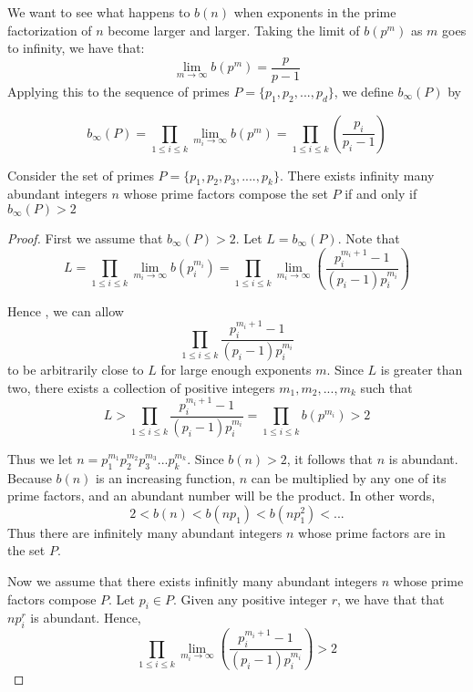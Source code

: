 \documentclass[../paper.tex]{article}
\begin{document}
We want to see what happens to $b(n)$ when exponents in the prime
factorization of $n$ become larger and larger. Taking the limit of
$b(p^m)$ as $m$ goes to infinity, we have that:
$$\lim_{m \rightarrow \infty}b(p^m) = \frac{p}{p-1}$$
Applying this to the sequence of primes $P = \{p_1, p_2, ..., p_d\}$,
we define $b_{\infty}(P)$ by

\begin{equation}\label{b_inf_def}
  b_{\infty}(P) 
  = \prod_{1 \leq i \leq k} \lim_{m_i \rightarrow \infty}b(p^m)
                = \prod_{1 \leq i \leq k}(\frac{p_i}{p_i - 1})
\end{equation}


\begin{theorem}\label{b_inf_1}
Consider the set of primes 
%
$P = \{p_{1}, p_{2}, p_{3}, .... , p_{k}\}$.
%
There exists infinity many abundant integers $n$ whose prime 
factors compose the set $P$  if and only if $b_{\infty}(P) > 2$

\end{theorem}

\begin{proof}

First we assume that $b_{\infty}(P) > 2$. Let $L = b_\infty(P)$. 
Note that
%  
$$L 
%
= \prod_{1 \leq i \leq k} \lim_{m_i \rightarrow \infty}b(p_i^{m_i}) 
%
= \prod_{1 \leq i \leq k} \lim_{m_i \rightarrow \infty} 
%
( \frac{p_i^{m_{i} + 1} -1}{(p_i -1)p_{i}^{m_{i}}})$$

Hence , we can allow
$$\prod_{1 \leq i \leq k} \frac{p_i^{m_{i} + 1} -1}
{(p_i -1)p_{i}^{m_{i}}}$$ 
to be arbitrarily close to $L$ for large 
enough exponents $m$. Since $L$ is greater than two, there exists a
collection of positive integers $m_1, m_2, ... , m_k$ such that 
% 
$$L > \prod_{1 \leq i \leq k} \frac{p_i^{m_{i} + 1} -1}
{(p_i -1)p_{i}^{m_{i}}} = \prod_{1 \leq i \leq k} b(p^{m_i}) > 2$$
%

Thus we let $n=p_1^{m_1}p_2^{m_2}p_3^{m_3}...p_{k}^{m_k}$. 
Since $b(n) > 2$, it follows that $n$ is abundant. 
Because $b(n)$ is an increasing function, $n$ can be multiplied
by any one of its prime factors, and an abundant number 
will be the product. In other words,
%
$$2 < b(n) < b(np_1) < b(np_1^2) < ...$$
%
Thus there are infinitely many abundant integers $n$ whose prime
factors are in the set $P$.

Now we assume that there exists infinitly many abundant integers 
$n$ whose prime factors compose $P$. Let $p_i \in P$. Given any
positive integer $r$, we have that that $np_i^r$ is abundant. 
Hence,
%
$$\prod_{1 \leq i \leq k} \lim_{m_i \rightarrow \infty} 
( \frac{p_i^{m_{i} + 1} -1}{(p_i -1)p_{i}^{m_{i}}}) > 2$$

\end{proof}
\end{document}
